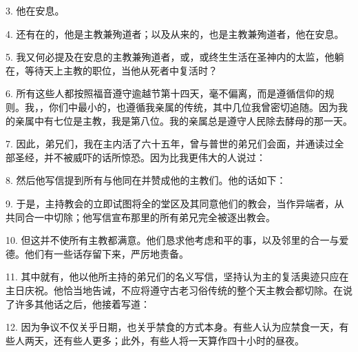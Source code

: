 3. 他在安息。\par

4. 还有在的，他是主教兼殉道者；以及从来的，也是主教兼殉道者，他在安息。\par

5. 我又何必提及在安息的主教兼殉道者，或，或终生生活在圣神内的太监，他躺在，等待天上主教的职位，当他从死者中复活时？\par

6. 所有这些人都按照福音遵守逾越节第十四天，毫不偏离，而是遵循信仰的规则。我，，你们中最小的，也遵循我亲属的传统，其中几位我曾密切追随。因为我的亲属中有七位是主教，我是第八位。我的亲属总是遵守人民除去酵母的那一天。\par

7. 因此，弟兄们，我在主内活了六十五年，曾与普世的弟兄们会面，并通读过全部圣经，并不被威吓的话所惊恐。因为比我更伟大的人说过：\par

8. 然后他写信提到所有与他同在并赞成他的主教们。他的话如下：\par

\par

9. 于是，主持教会的立即试图将全的堂区及其同意他们的教会，当作异端者，从共同合一中切除；他写信宣布那里的所有弟兄完全被逐出教会。\par

10. 但这并不使所有主教都满意。他们恳求他考虑和平的事，以及邻里的合一与爱德。他们有一些话存留下来，严厉地责备。\par

11. 其中就有，他以他所主持的弟兄们的名义写信，坚持认为主的复活奥迹只应在主日庆祝。他恰当地告诫，不应将遵守古老习俗传统的整个天主教会都切除。在说了许多其他话之后，他接着写道：\par

12. 因为争议不仅关乎日期，也关乎禁食的方式本身。有些人认为应禁食一天，有些人两天，还有些人更多；此外，有些人将一天算作四十小时的昼夜。\par

